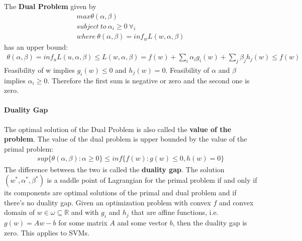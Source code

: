 \documentclass[main]{subfiles}
\begin{document}
The \textbf{Dual Problem} given by
\begin{align}
max \theta(\alpha, \beta) \\
subject \ to \ \alpha_i \geq 0 \ \forall_i \\
where \ \theta(\alpha, \beta)=inf_w L(w, \alpha, \beta)
\end{align}
has an upper bound:
\begin{align}
\theta(\alpha, \beta)=inf_u L(u, \alpha, \beta) \leq L(w, \alpha, \beta)=f(w)+\sum_i \alpha_i g_i(w) + \sum_j \beta_j h_j(w) \leq f(w)
\end{align}
Feasibility of w implies $g_i(w)\leq 0$ and $h_j(w)=0$. \newline
Feasibility of $\alpha$ and $\beta$ implies $\alpha_i \geq 0$. \newline
Therefore the first sum is negative or zero and the second one is zero.\newline
\paragraph{Duality Gap}
The optimal solution of the Dual Problem is also called the \textbf{value of the problem}.
The value of the dual problem is upper bounded by the value of the primal problem:
\begin{align}
sup\{\theta(\alpha,\beta): \alpha \geq 0 \} \leq inf \{f(w): g(w) \leq 0, h(w) = 0\}
\end{align}
The difference between the two is called the \textbf{duality gap}. The solution $(w^*, \alpha^*, \beta^*)$ is a saddle point of Lagrangian for the primal problem if and only if its components are optimal solutions of the primal and dual problem and if there's no duality gap. \newline
Given an optimization problem with convex $f$ and convex domain of $w \in \omega \subseteq \mathbb{R}$ and with $g_i$ and $h_j$ that are affine functions, i.e. $g(w)=Aw-b$ for some matrix $A$ and some vector $b$, then the duality gap is zero. This applies to SVMs.
\end{document}
